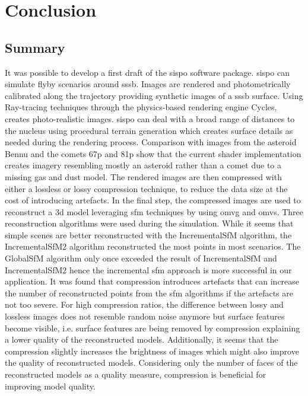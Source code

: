 \section{Conclusion} \label{sec:conclusion}
\subsection{Summary}
It was possible to develop a first draft of the \gls{sispo} software package. \Gls{sispo} can simulate flyby scenarios around \gls{sssb}. Images are rendered and photometrically calibrated along the trajectory providing synthetic images of a \gls{sssb} surface. Using Ray-tracing techniques through the physics-based rendering engine Cycles, creates photo-realistic images. \Gls{sispo} can deal with a broad range of distances to the nucleus using procedural terrain generation which creates surface details as needed during the rendering process. Comparison with images from the asteroid Bennu and the comets \gls{67p} and \gls{81p} show that the current shader implementation creates imagery resembling mostly an asteroid rather than a comet due to a missing gas and dust model. The rendered images are then compressed with either a lossless or lossy compression technique, to reduce the data size at the cost of introducing artefacts. In the final step, the compressed images are used to reconstruct a \gls{3d} model leveraging \gls{sfm} techniques by using \gls{omvg} and \gls{omvs}. Three reconstruction algorithms were used during the simulation. While it seems that simple scenes are better reconstructed with the IncrementalSfM algorithm, the IncrementalSfM2 algorithm reconstructed the most points in most scenarios. The GlobalSfM algorithm only once exceeded the result of IncrementalSfM and IncrementalSfM2 hence the incremental \gls{sfm} approach is more successful in our application. It was found that compression introduces artefacts that can increase the number of reconstructed points from the \gls{sfm} algorithms if the artefacts are not too severe. For high compression ratios, the difference between lossy and lossless images does not resemble random noise anymore but surface features become visible, i.e. surface features are being removed by compression explaining a lower quality of the reconstructed models. Additionally, it seems that the compression slightly increases the brightness of images which might also improve the quality of reconstructed models. Considering only the number of faces of the reconstructed models as a quality measure, compression is beneficial for improving model quality.
